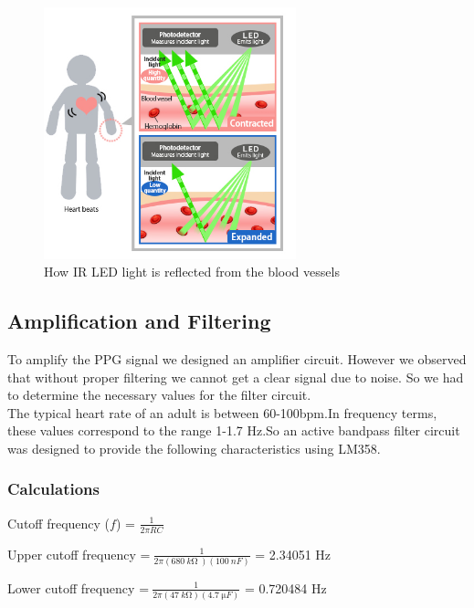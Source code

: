 \documentclass[12pt]{article}
\begin{document}
	\begin{figure}[!htbp]  %

		\centering
		\includegraphics[width=0.65\textwidth]{sensing.jpg}
		\caption{How IR LED light is reflected from the blood vessels\cite{epson_sensor}}
	\end{figure}


		\subsection{Amplification and Filtering}
		
		To amplify the PPG signal we designed an amplifier circuit. However we observed that without proper filtering we cannot get a clear signal due to noise.
		So we had to determine the necessary values for the filter circuit.\\
		The typical heart rate of an adult is between 60-100bpm\cite{typical_pulse}.In frequency terms, these values correspond to the range 1-1.7 Hz.So an active bandpass filter circuit was designed to provide the following characteristics using LM358.


\subsubsection{Calculations}
\label{sec:4.2.1}
\begin{center}
	Cutoff frequency ($f$) = $\frac{1}{2\pi RC}$
	
	
	
	Upper cutoff frequency =$\ \frac{1}{2\pi ( 680\ k\si{\ohm}\ )( 100\ nF)}$ = 2.34051 Hz
	
	
	
	Lower cutoff frequency =$\ \frac{1}{2 \pi  ( 47\ k\si{\ohm})( 4.7\ \si{\micro}F)}$ = 0.720484 Hz
	\end{center}
	
\end{document}
